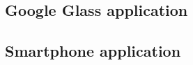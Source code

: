 \subsection{Google Glass application}
\label{app:code:ggApp}


\subsection{Smartphone application}
\label{app:code:spApp}
